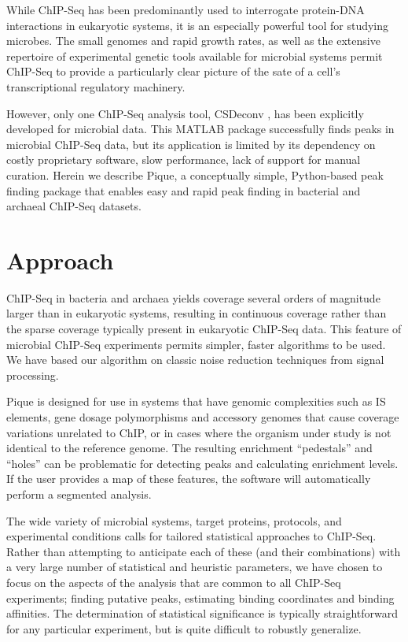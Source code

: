 \documentclass{bioinfo}
\begin{document}
While ChIP-Seq has been predominantly used to interrogate protein-DNA
interactions in eukaryotic systems, it is an especially powerful tool
for studying microbes. The small genomes and rapid growth rates, as
well as the extensive repertoire of experimental genetic tools
available for microbial systems permit ChIP-Seq to provide a
particularly clear picture of the sate of a cell's transcriptional
regulatory machinery.

However, only one ChIP-Seq analysis tool, CSDeconv \cite{CSDeconv},
has been explicitly developed for microbial data. This MATLAB package
successfully finds peaks in microbial ChIP-Seq data, but its
application is limited by its dependency on costly proprietary
software, slow performance, lack of support for manual
curation. Herein we describe Pique, a conceptually simple,
Python-based peak finding package that enables easy and rapid peak
finding in bacterial and archaeal ChIP-Seq datasets.

\section{Approach}

\noindent ChIP-Seq in bacteria and archaea yields coverage several
orders of magnitude larger than in eukaryotic systems, resulting in
continuous coverage rather than the sparse coverage typically present
in eukaryotic ChIP-Seq data.  This feature of microbial ChIP-Seq
experiments permits simpler, faster algorithms to be used. We have
based our algorithm on classic noise reduction techniques from signal
processing.

Pique is designed for use in systems that have genomic complexities
such as IS elements, gene dosage polymorphisms and accessory genomes
that cause coverage variations unrelated to ChIP, or in cases where
the organism under study is not identical to the reference genome. The
resulting enrichment ``pedestals'' and ``holes'' can be problematic
for detecting peaks and calculating enrichment levels. If the user
provides a map of these features, the software will automatically
perform a segmented analysis.

The wide variety of microbial systems, target proteins, protocols, and
experimental conditions calls for tailored statistical approaches to
ChIP-Seq. Rather than attempting to anticipate each of these (and
their combinations) with a very large number of statistical and
heuristic parameters, we have chosen to focus on the aspects of the
analysis that are common to all ChIP-Seq experiments; finding putative
peaks, estimating binding coordinates and binding affinities. The
determination of statistical significance is typically straightforward
for any particular experiment, but is quite difficult to robustly
generalize.
\end{document}
